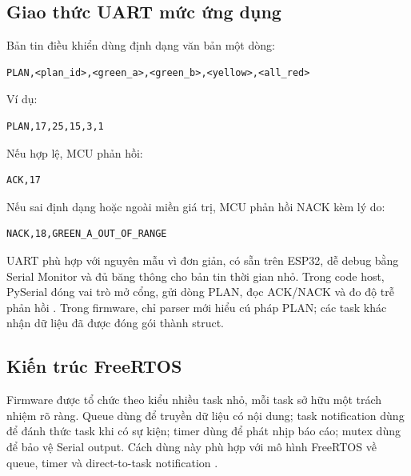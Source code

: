 \subsection{Giao thức UART mức ứng dụng}

Bản tin điều khiển dùng định dạng văn bản một dòng:

\begin{lstlisting}
PLAN,<plan_id>,<green_a>,<green_b>,<yellow>,<all_red>
\end{lstlisting}

Ví dụ:

\begin{lstlisting}
PLAN,17,25,15,3,1
\end{lstlisting}

Nếu hợp lệ, MCU phản hồi:

\begin{lstlisting}
ACK,17
\end{lstlisting}

Nếu sai định dạng hoặc ngoài miền giá trị, MCU phản hồi NACK kèm lý do:

\begin{lstlisting}
NACK,18,GREEN_A_OUT_OF_RANGE
\end{lstlisting}

UART phù hợp với nguyên mẫu vì đơn giản, có sẵn trên ESP32, dễ debug bằng Serial Monitor và đủ băng thông cho bản tin thời gian nhỏ. Trong code host, PySerial đóng vai trò mở cổng, gửi dòng PLAN, đọc ACK/NACK và đo độ trễ phản hồi \cite{pyserial_api,pena_uart}. Trong firmware, chỉ parser mới hiểu cú pháp PLAN; các task khác nhận dữ liệu đã được đóng gói thành struct.

\subsection{Kiến trúc FreeRTOS}

Firmware được tổ chức theo kiểu nhiều task nhỏ, mỗi task sở hữu một trách nhiệm rõ ràng. Queue dùng để truyền dữ liệu có nội dung; task notification dùng để đánh thức task khi có sự kiện; timer dùng để phát nhịp báo cáo; mutex dùng để bảo vệ Serial output. Cách dùng này phù hợp với mô hình FreeRTOS về queue, timer và direct-to-task notification \cite{barry_freertos,freertos_queues,freertos_timers,freertos_task_notifications}.


